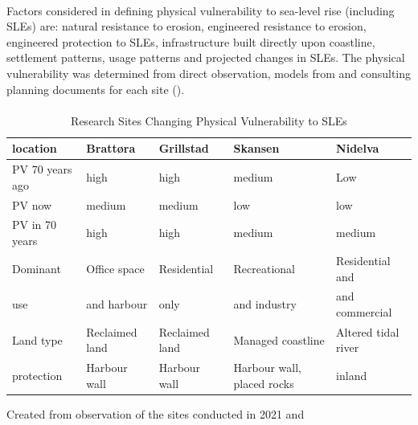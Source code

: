 \paragraph{}


Factors considered in defining physical vulnerability to sea-level rise (including SLEs) are: natural resistance to erosion, engineered resistance to erosion, engineered protection to SLEs, infrastructure built directly upon coastline, settlement patterns, usage patterns and projected changes in SLEs. The physical vulnerability was determined from direct observation,  models from \cite{kartverket_se_2021} and consulting planning documents for each site (\cite{miljoenheten_og_byplankontoret_trondheim_kommune_9-notat-om-havnivastigning-og-stormflo---hensyn-i-arealplanlegging-nyhavnapdf_2020}). 


\paragraph{}
\begin{table}[!ht]
    \centering
    \begin{tabular}{|l|l|l|l|l|}
    \hline
        \textbf{location} & \textbf{Brattøra} & \textbf{Grillstad} & \textbf{Skansen}  & \textbf{Nidelva} \\ \hline
        PV 70 years ago & high & high & medium & Low \\ \hline
        PV now &  medium &  medium &  low &  low \\ \hline
        PV in 70 years &  high &  high &  medium &  medium \\ \hline
        Dominant & Office space  & Residential & Recreational  & Residential and \\ \newline
        use & and harbour &  only   &  and industry & and commercial  \\ \hline
        Land type & Reclaimed land & Reclaimed land & Managed coastline  & Altered tidal river \\ \hline
        protection & Harbour wall & Harbour wall & Harbour wall, placed rocks & inland \\ \hline
    \end{tabular}
    \caption{ Research Sites Changing Physical Vulnerability to SLEs}{Created from observation of the sites conducted in 2021 and \cite{kartverket_se_2021}}
    \label{table:research_site}
\end{table}

